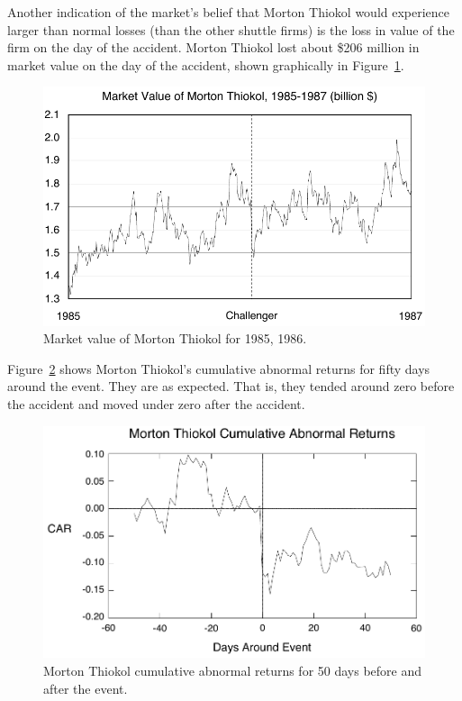 Another indication of the market's belief that Morton Thiokol would experience larger than normal losses (than the other shuttle firms) is the loss in value of the firm on the day of the accident. Morton Thiokol lost about \$206 million in market value on the day of the accident, shown graphically in Figure~\ref{thval}.

\begin{figure}[hp]
\begin{center}
%
\includegraphics{thval-final}
\end{center}
\caption{Market value of Morton Thiokol for 1985, 1986.}
\label{thval}
\end{figure}

Figure~\ref{thcar} shows Morton Thiokol's cumulative abnormal returns for fifty days around the event. They are as expected. That is, they tended around zero before the accident and moved under zero after the accident.

\begin{figure}[hp]
\begin{center}
%
\includegraphics{thcar-final}
\end{center}
\caption{Morton Thiokol cumulative abnormal returns for 50
days before and after the event.}
\label{thcar}
\end{figure}
\clearpage



